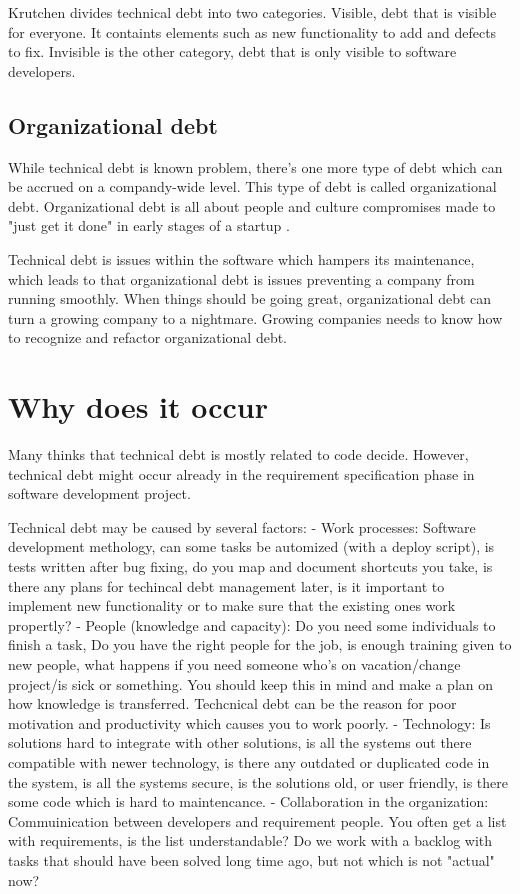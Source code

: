 Krutchen divides technical debt into two categories. Visible, debt that is visible for everyone. It containts elements such as new functionality to add and defects to fix. Invisible is the other category, debt that is only visible to software developers.

\subsection{Organizational debt}
While technical debt is known problem, there's one more type of debt which can be accrued on a compandy-wide level. This type of debt is called organizational debt. Organizational debt is all about people and culture compromises made to "just get it done" in early stages of a startup \cite{steve-blank}.  

Technical debt is issues within the software which hampers its maintenance, which leads to that organizational debt is issues preventing a company from running smoothly. When things should be going great, organizational debt can turn a growing company to a nightmare. Growing companies needs to know how to recognize and refactor organizational debt. 

\section{Why does it occur}
Many thinks that technical debt is mostly related to code decide. However, technical debt might occur already in the requirement specification phase in software development project. 

Technical debt may be caused by several factors:
- Work processes: Software development methology, can some tasks be automized (with a deploy script), is tests written after bug fixing, do you map and document shortcuts you take, is there any plans for techincal debt management later, is it important to implement new functionality or to make sure that the existing ones work propertly?
- People (knowledge and capacity): Do you need some individuals to finish a task, Do you have the right people for the job, is enough training given to new people, what happens if you need someone who's on vacation/change project/is sick or something. You should keep this in mind and make a plan on how knowledge is transferred. Techcnical debt can be the reason for poor motivation and productivity which causes you to work poorly. 
- Technology: Is solutions hard to integrate with other solutions, is all the systems out there compatible with newer technology, is there any outdated or duplicated code in the system, is all the systems secure, is the solutions old, or user friendly, is there some code which is hard to maintencance. 
- Collaboration in the organization: Commuinication between developers and requirement people. You often get a list with requirements, is the list understandable? Do we work with a backlog with tasks that should have been solved long time ago, but not which is not "actual" now?

